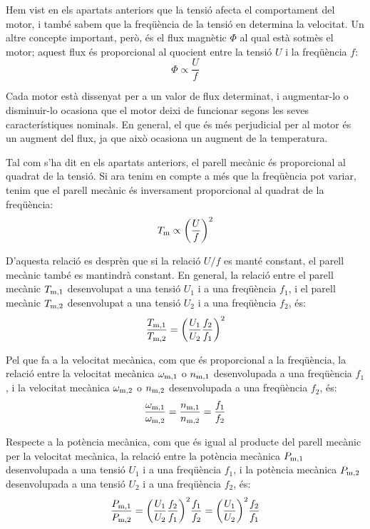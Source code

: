 Hem vist en els apartats anteriors que la tensió afecta el comportament del motor, i també sabem que la freqüència de la tensió en determina la velocitat. Un altre concepte important, però, és el flux magnètic $\Phi$ al qual està sotmès el motor; aquest flux és proporcional al quocient entre la tensió $U$ i la freqüència $f$:
\begin{equation}
	\Phi \propto \frac{U}{f}
\end{equation}

Cada motor està dissenyat per a un valor de flux determinat, i augmentar-lo  o disminuir-lo ocasiona que el motor deixi de funcionar segons les seves característiques nominals. En general, el que és més perjudicial per al motor és un augment del flux, ja que això ocasiona un  augment de la temperatura.

Tal com s'ha dit en els apartats anteriors, el parell mecànic és proporcional al quadrat de la tensió. Si ara tenim en compte a més que la freqüència pot variar, tenim que el parell mecànic és inversament proporcional al quadrat de la freqüència:
\begin{equation}
	T_\mathrm{m} \propto {\left(\frac{U}{f}\right)}^2
\end{equation}

D'aquesta relació es desprèn que si la relació $U/f$ es manté constant, el parell mecànic també es mantindrà constant. En general, la relació entre el parell mecànic $T_\mathrm{m,1}$ desenvolupat a una tensió $U_1$ i a una freqüència $f_1$, i el parell mecànic $T_\mathrm{m,2}$ desenvolupat a una tensió $U_2$ i a una freqüència $f_2$, és:
\begin{equation}\label{eq:Tm_U_f}
	\frac{T_\mathrm{m,1}}{T_\mathrm{m,2}}={\left(\frac{{U}_{1}}{{U}_{2}}\frac{{f}_{2}}{{f}_{1}}\right)}^2
\end{equation}

Pel que fa a la velocitat mecànica, com que és proporcional a la freqüència, la relació entre la velocitat mecànica $\omega_\mathrm{m,1}$ o $n_\mathrm{m,1}$ desenvolupada a una freqüència $f_1$, i la velocitat mecànica $\omega_\mathrm{m,2}$ o $n_\mathrm{m,2}$ desenvolupada a una freqüència $f_2$, és:
\begin{equation}\label{eq:nm_U_f}
	\frac{\omega_\mathrm{m,1}}{\omega_\mathrm{m,2}} = \frac{n_\mathrm{m,1}}{n_\mathrm{m,2}} = \frac{f_1}{f_2}
\end{equation}

Respecte a la  potència mecànica, com que  és igual al producte del parell mecànic per la velocitat mecànica, la relació entre la potència mecànica $P_\mathrm{m,1}$ desenvolupada a una tensió $U_1$ i a una freqüència $f_1$, i la potència mecànica $P_\mathrm{m,2}$ desenvolupada a una tensió $U_2$ i a una freqüència $f_2$, és:
\begin{equation}\label{eq:Pm_U_f}
	\frac{P_\mathrm{m,1}}{P_\mathrm{m,2}} =
	{\left(\frac{{U}_{1}}{{U}_{2}}\frac{{f}_{2}}{{f}_{1}}\right)}^2
	\frac{f_1}{f_2} = 	
	 {\left(\frac{{U}_{1}}{{U}_{2}}\right)}^{2} \frac{{f}_{2}}{{f}_{1}}
\end{equation}

